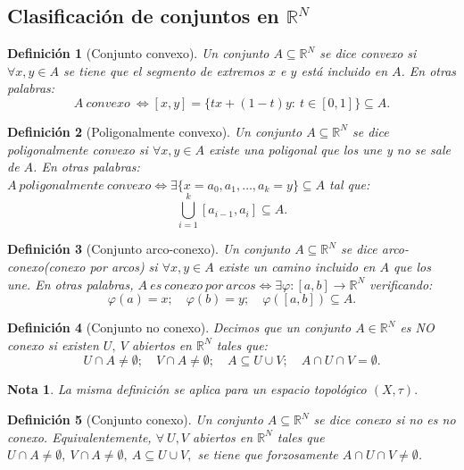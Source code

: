 \documentclass[11pt, a4paper, titlepage]{article}
\theoremstyle{theorem-style}
\theoremstyle{definition-style}
\newtheorem*{ndef}{Definición}
\theoremstyle{remark-style}
\newtheorem*{nota}{Nota}
\theoremstyle{example-style}
\begin{document}
\subsection{Clasificación de conjuntos en $\mathbb{R}^N$}

\begin{ndef}[Conjunto convexo]
Un conjunto $A\subseteq \mathbb{R}^N$ se dice \textit{convexo} si $\forall x,y \in A$ se tiene que el segmento de extremos $x$ e $y$ está incluido en $A$. En otras palabras: $$A\ convexo\ \iff [x,y] = \{tx + (1-t)y: \ t\in [0,1]\} \subseteq A.$$
\end{ndef}



\begin{ndef}[Poligonalmente convexo]
Un conjunto $A\subseteq \mathbb{R}^N$ se dice \textit{poligonalmente convexo} si  $\forall x,y \in A$ existe una poligonal que los une y no se sale de $A$. En otras palabras:  $A\ poligonalmente\ convexo \iff \exists \{x= a_0, a_1,\dots,a_k=y \}\subseteq A$ tal que: $$\bigcup_{i=1}^k [a_{i-1},a_i] \subseteq A.$$
\end{ndef}



\begin{ndef}[Conjunto arco-conexo]
Un conjunto $A \subseteq \mathbb{R}^N$ se dice \emph{arco-conexo(conexo por arcos)} si $\forall x,y \in A$ existe un camino incluido en $A$ que los une. En otras palabras,  $A\ es\ conexo\ por\ arcos \iff \exists \varphi:[a,b] \longrightarrow \mathbb{R}^N$ verificando: $$\varphi(a) = x;\quad \varphi(b) = y;\quad \varphi([a,b]) \subseteq A.$$
\end{ndef}



\begin{ndef}[Conjunto no conexo]
Decimos que un conjunto $A\in \mathbb{R}^N$ es \textit{NO conexo} si existen $U,\ V$ abiertos en $\mathbb{R}^N$ tales que: $$U \cap A \ne \emptyset;\quad V \cap A \ne \emptyset;\quad A \subseteq U \cup V;\quad A \cap U \cap V = \emptyset.$$
\end{ndef}



\begin{nota}
La misma definición se aplica para un espacio topológico $(X,\tau).$
\end{nota}



\begin{ndef}[Conjunto conexo]
Un conjunto $A\subseteq \mathbb{R}^N$ se dice conexo si no es no conexo. Equivalentemente, $\forall \ U,V$ abiertos en $\mathbb{R}^N$ tales que $U \cap A \ne \emptyset, \ V \cap A \ne \emptyset,\ A \subseteq U \cup V,$ se tiene que forzosamente $A \cap U \cap V \ne \emptyset$.
\end{ndef}
\end{document}
